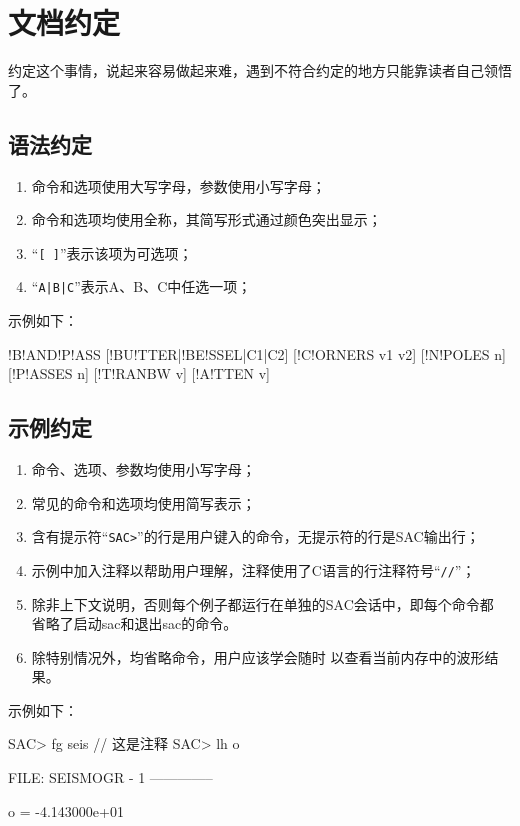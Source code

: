 \section{文档约定}
约定这个事情，说起来容易做起来难，遇到不符合约定的地方只能靠读者自己领悟了。

\subsection*{语法约定}
\begin{enumerate}
\item 命令和选项使用大写字母，参数使用小写字母；
\item 命令和选项均使用全称，其简写形式通过颜色突出显示；
\item ``\lstinline{[ ]}''表示该项为可选项；
\item ``\lstinline{A|B|C}''表示A、B、C中任选一项；
\end{enumerate}

示例如下：
\begin{SACSyntax}
!B!AND!P!ASS [!BU!TTER|!BE!SSEL|C1|C2] [!C!ORNERS v1 v2] [!N!POLES n] 
    [!P!ASSES n] [!T!RANBW v] [!A!TTEN v]
\end{SACSyntax}

\subsection*{示例约定}
\begin{enumerate}
\item 命令、选项、参数均使用小写字母；
\item 常见的命令和选项均使用简写表示；
\item 含有提示符``\lstinline{SAC>}''的行是用户键入的命令，无提示符的行是SAC输出行；
\item 示例中加入注释以帮助用户理解，注释使用了C语言的行注释符号``\lstinline{//}''；
\item 除非上下文说明，否则每个例子都运行在单独的SAC会话中，即每个命令都
    省略了启动sac和退出sac的命令。
\item 除特别情况外，均省略命令，用户应该学会随时
    以查看当前内存中的波形结果。
\end{enumerate}

示例如下：
\begin{SACCode}
SAC> fg seis                    // 这是注释
SAC> lh o
  
  FILE: SEISMOGR - 1
 --------------

     o = -4.143000e+01
\end{SACCode}
